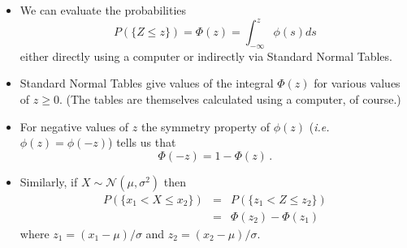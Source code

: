 \documentclass[notes=show,smaller,handout]{beamer}\usepackage[]{graphicx}\usepackage[]{color}
\renewcommand{\Pr}{P}
\newcommand{\N}{\mathcal{N}}
\newenvironment{stepitemize}{\begin{itemize}[<+->]}{\end{itemize} }
\begin{document}
\begin{frame}{\secname}


\begin{stepitemize}
\item We can evaluate the probabilities
$$
\Pr(\{Z\leq z\})=\Phi(z)=\int_{-\infty}^z\phi(s)ds
$$
either directly using a computer or indirectly via Standard Normal
Tables.
\item Standard Normal Tables give values of the integral $\Phi(z)$ for various values of $z\geq 0$. (The tables are themselves
calculated using a computer, of course.)
\item For negative values of $z$ the symmetry property of $\phi(z)$ (\textit{i.e.} $\phi(z)=\phi(-z)$) tells us that
$$
\Phi(-z)=1-\Phi(z)\,.
$$
\item Similarly, if $X\sim \N\left( \mu ,\sigma ^{2}\right) $ then
\begin{eqnarray*}
\Pr(\{x_1<X\leq x_2\})&=&\Pr(\{z_1<Z\leq z_2\})\\
 &=&\Phi(z_2)-\Phi(z_1)
 \end{eqnarray*}
where $z_1=(x_1-\mu)/\sigma$ and $z_2=(x_2-\mu)/\sigma$.

\end{stepitemize}

\end{frame}%
\end{document}
